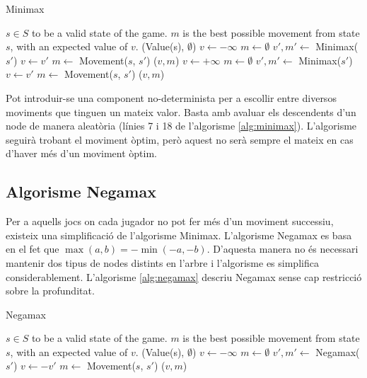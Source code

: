 \documentclass[12pt,a4paper]{article}
\begin{document}
\begin{algorithm}[H]
\caption{Minimax}
\label{alg:minimax}
\begin{algorithmic}[5]
\Require $s \in S$ to be a valid state of the game.
\Ensure $m$ is the best possible movement from state $s$, with an expected value of $v$. 
	\State \Return (Value(s), $\emptyset$)
\Else
		\State $v \leftarrow -\infty$
		\State $m \leftarrow \emptyset$
			\State $v',m' \leftarrow$ Minimax($s'$)
				\State $v \leftarrow v'$
				\State $m \leftarrow$ Movement($s$, $s'$)
			\EndIf
		\EndFor
		\State \Return ($v, m$)
	\Else
		\State $v \leftarrow +\infty$
		\State $m \leftarrow \emptyset$
			\State $v',m' \leftarrow$ Minimax($s'$)
				\State $v \leftarrow v'$
				\State $m \leftarrow$ Movement($s$, $s'$)
			\EndIf
		\EndFor
		\State \Return ($v, m$)
	\EndIf
\EndIf
\end{algorithmic}
\end{algorithm}

Pot introduir-se una component no-determinista per a escollir entre diversos moviments que tinguen un mateix valor. Basta amb avaluar els descendents d'un node de manera aleatòria (línies 7 i 18 de l'algorisme \ref{alg:minimax}). L'algorisme seguirà trobant el moviment òptim, però aquest no serà sempre el mateix en cas d'haver més d'un moviment òptim.\\

\subsection{Algorisme Negamax}
Per a aquells jocs on cada jugador no pot fer més d'un moviment successiu, existeix una simplificació de l'algorisme Minimax. L'algorisme Negamax\cite{knuth1976analysis} es basa en el fet que $\max(a,b) = -\min(-a,-b)$. D'aquesta manera no és necessari mantenir dos tipus de nodes distints en l'arbre i l'algorisme es simplifica considerablement. L'algorisme \ref{alg:negamax} descriu Negamax sense cap restricció sobre la profunditat.\\

\begin{algorithm}[H]
\caption{Negamax}
\label{alg:negamax}
\begin{algorithmic}[5]
\Require $s \in S$ to be a valid state of the game.
\Ensure $m$ is the best possible movement from state $s$, with an expected value of $v$. 
	\State \Return (Value(s), $\emptyset$)
\Else
	\State $v \leftarrow -\infty$
	\State $m \leftarrow \emptyset$
		\State $v',m' \leftarrow$ Negamax($s'$)
			\State $v \leftarrow -v'$
			\State $m \leftarrow$ Movement($s$, $s'$)
		\EndIf
	\EndFor
	\State \Return ($v, m$)
\EndIf
\end{algorithmic}
\end{algorithm}
\end{document}
